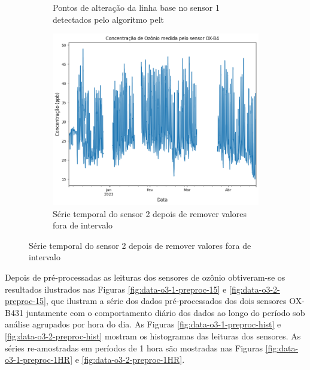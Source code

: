 \begin{figure}[h]
\begin{subfigure}{0.495\textwidth}
        \caption{Pontos de alteração da linha base no sensor 1 detectados pelo algoritmo \acrshort{pelt}}
        \label{fig:data-rebase-o3-1}
    \end{subfigure}
    \hfill
    \begin{subfigure}{0.495\textwidth}
        \includegraphics[width=\textwidth]{chapters/3-RESULTADOS CAMPO/Figuras/raw-o3-b4-2.png}
        \caption{Série temporal do sensor 2 depois de remover valores fora de intervalo}
        \label{fig:data-o3-2-raw}
    \end{subfigure}
    \label{fig:data-o3-raw-and-pelt}
\end{figure}

Depois de pré-processadas as leituras dos sensores de ozônio obtiveram-se os resultados ilustrados nas Figuras \ref{fig:data-o3-1-preproc-15} e \ref{fig:data-o3-2-preproc-15}, que ilustram a série dos dados pré-processados dos dois sensores OX-B431 juntamente com o comportamento diário dos dados ao longo do período sob análise agrupados por hora do dia. As Figuras \ref{fig:data-o3-1-preproc-hist} e \ref{fig:data-o3-2-preproc-hist} mostram os histogramas das leituras dos sensores. As séries re-amostradas em períodos de 1 hora são mostradas nas Figuras \ref{fig:data-o3-1-preproc-1HR} e \ref{fig:data-o3-2-preproc-1HR}.

